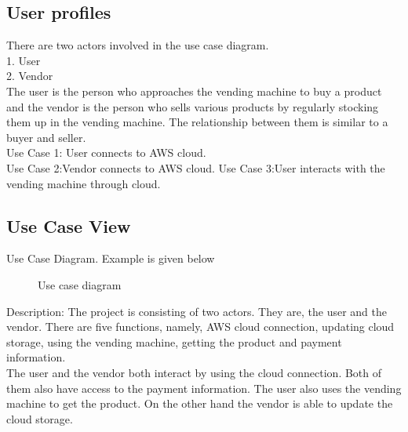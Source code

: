 \documentclass[oneside,a4paper,12pt]{report}
\begin{document}
\subsection{User profiles}  
There are two actors involved in the use case diagram.\\
1. User\\
2. Vendor\\
The user is the person who approaches the vending machine to buy a product and the vendor is the person who sells various products by regularly stocking them up in the vending machine. The relationship between them is similar to a buyer and seller.\\
Use Case 1: User connects to AWS cloud.\\
Use Case 2:Vendor connects to AWS cloud.
Use Case 3:User interacts with the vending machine through cloud.\\

\subsection{Use Case View}
Use Case Diagram. Example is given below
\begin{center}
	\begin{figure}[!htbp]
		\centering
	  \caption{Use case diagram}
	  \label{fig:usecase}
	\end{figure}
\end{center}  
\newpage
Description:
The project is consisting of two actors. They are, the user and the vendor. There are five functions, namely, AWS cloud connection, updating cloud storage, using the vending machine, getting the product and payment information.\\
The user and the vendor both interact by using the cloud connection. Both of them also have access to the payment information. The user also uses the vending machine to get the product. On the other hand the vendor is able to update the cloud storage.\\
\end{document}
